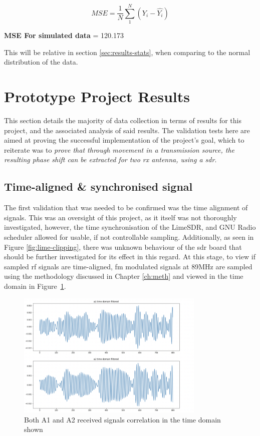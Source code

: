 \documentclass[class=report,11pt,crop=false]{standalone}
\begin{document}
\begin{equation}
    MSE = \frac{1}{N} \sum_1^N{(Y_i - \hat{Y_i})}
\end{equation}

\textbf{MSE For simulated data} = 120.173

This will be relative in section \ref{sec:results-stats}, when comparing to the normal distribution of the data.

\section{Prototype Project Results}
This section details the majority of data collection in terms of results for this project, and the associated analysis of said results. The validation tests here are aimed at proving the successful implementation of the project's goal, which to reiterate was to \emph{prove that through movement in a transmission source, the resulting phase shift can be extracted for two \gls{rx} antenna, using a \gls{sdr}}.

\subsection{Time-aligned \& synchronised signal}
The first validation that was needed to be confirmed was the time alignment of signals. This was an oversight of this project, as it itself was not thoroughly investigated, however, the time synchronisation of the LimeSDR, and GNU Radio scheduler allowed for usable, if not controllable sampling. Additionally, as seen in Figure \ref{fig:lime-clipping}, there was unknown behaviour of the \gls{sdr} board that should be further investigated for its effect in this regard. At this stage, to view if sampled \gls{rf} signals are time-aligned, \gls{fm} modulated signals at 89MHz are sampled using the methodology discussed in Chapter \ref{ch:meth} and viewed in the time domain in Figure~\ref{fig:time-align}.

\begin{figure}[h]
    \centering
    \includegraphics[width=0.8\textwidth]{Images/plots/time relation.png}
    \caption{Both A1 and A2 received signals correlation in the time domain shown}
    \label{fig:time-align}
\end{figure}
\end{document}
